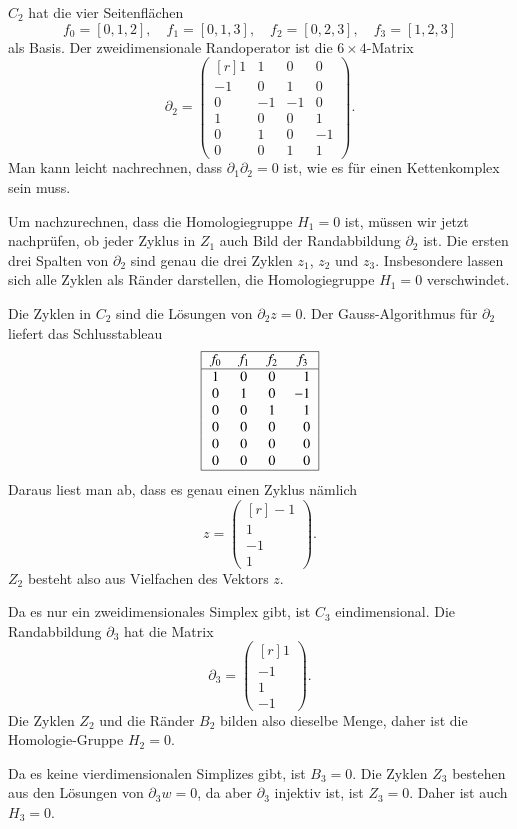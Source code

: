\begin{beispiel}
$C_2$ hat die vier Seitenflächen
\[
f_0=[0,1,2],\quad
f_1=[0,1,3],\quad
f_2=[0,2,3],\quad
f_3=[1,2,3]
\]
als Basis.
Der zweidimensionale Randoperator ist die $6\times 4$-Matrix 
\[
\partial_2
=
\begin{pmatrix*}[r]
 1& 1& 0& 0\\
-1& 0& 1& 0\\
 0&-1&-1& 0\\
 1& 0& 0& 1\\
 0& 1& 0&-1\\
 0& 0& 1& 1
\end{pmatrix*}.
\]
Man kann leicht nachrechnen, dass $\partial_1\partial_2=0$ ist, wie es
für einen Kettenkomplex sein muss.

Um nachzurechnen, dass die Homologiegruppe $H_1=0$ ist, müssen wir jetzt 
nachprüfen, ob jeder Zyklus in $Z_1$ auch Bild der Randabbildung $\partial_2$
ist.
Die ersten drei Spalten von $\partial_2$ sind genau die drei Zyklen
$z_1$, $z_2$ und $z_3$.
Insbesondere lassen sich alle Zyklen als Ränder darstellen, die
Homologiegruppe $H_1=0$ verschwindet.

Die Zyklen in $C_2$ sind die Lösungen von $\partial_2z=0$.
Der Gauss-Algorithmus für $\partial_2$ liefert das Schlusstableau
\[
\begin{tabular}{|>{$}c<{$}>{$}c<{$}>{$}c<{$}>{$}c<{$}|}
\hline
f_0&f_1&f_2&f_3\\
\hline
1&0&0& \phantom{-}1\\
0&1&0&-1\\
0&0&1& \phantom{-}1\\
0&0&0& \phantom{-}0\\
0&0&0& \phantom{-}0\\
0&0&0& \phantom{-}0\\
\hline
\end{tabular}
\]
Daraus liest man ab, dass es genau einen Zyklus nämlich
\[
z
=
\begin{pmatrix*}[r]
-1\\1\\-1\\1
\end{pmatrix*}.
\]
$Z_2$ besteht also aus Vielfachen des Vektors $z$.

Da es nur ein zweidimensionales Simplex gibt, ist $C_3$ eindimensional.
Die Randabbildung $\partial_3$ hat die Matrix
\[
\partial_3
=
\begin{pmatrix*}[r]
1\\
-1\\
1\\
-1
\end{pmatrix*}.
\]
Die Zyklen $Z_2$ und die Ränder $B_2$ bilden also dieselbe Menge, daher ist
die Homologie-Gruppe $H_2=0$.

Da es keine vierdimensionalen Simplizes gibt, ist $B_3=0$.
Die Zyklen $Z_3$ bestehen aus den Lösungen von $\partial_3w=0$, da
aber $\partial_3$ injektiv ist, ist $Z_3=0$.
Daher ist auch $H_3=0$.
\end{beispiel}

